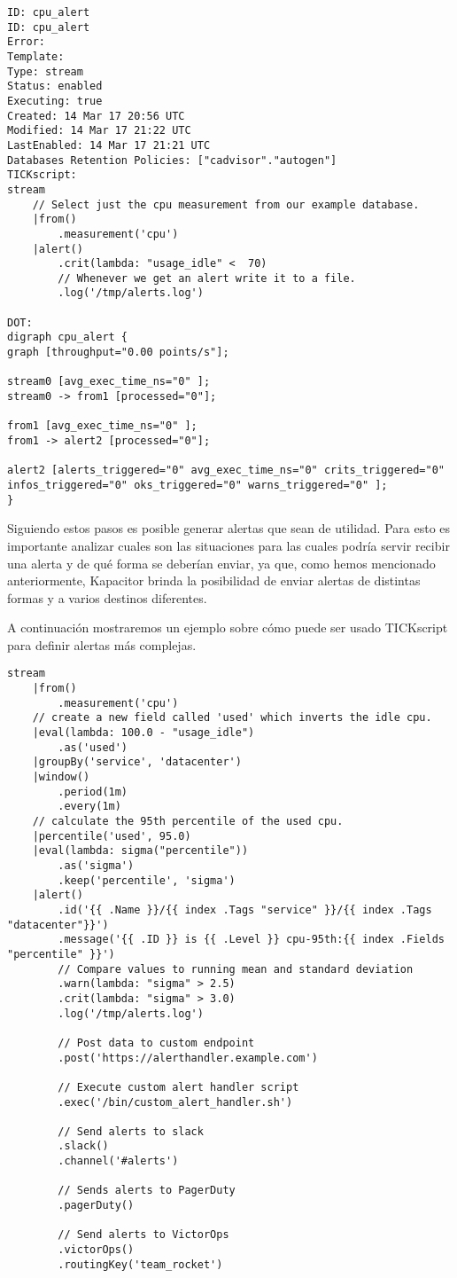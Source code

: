 \begin{lstlisting}
ID: cpu_alert
ID: cpu_alert
Error: 
Template: 
Type: stream
Status: enabled
Executing: true
Created: 14 Mar 17 20:56 UTC
Modified: 14 Mar 17 21:22 UTC
LastEnabled: 14 Mar 17 21:21 UTC
Databases Retention Policies: ["cadvisor"."autogen"]
TICKscript:
stream
    // Select just the cpu measurement from our example database.
    |from()
        .measurement('cpu')
    |alert()
        .crit(lambda: "usage_idle" <  70)
        // Whenever we get an alert write it to a file.
        .log('/tmp/alerts.log')

DOT:
digraph cpu_alert {
graph [throughput="0.00 points/s"];

stream0 [avg_exec_time_ns="0" ];
stream0 -> from1 [processed="0"];

from1 [avg_exec_time_ns="0" ];
from1 -> alert2 [processed="0"];

alert2 [alerts_triggered="0" avg_exec_time_ns="0" crits_triggered="0" infos_triggered="0" oks_triggered="0" warns_triggered="0" ];
}
\end{lstlisting}


Siguiendo estos pasos es posible generar alertas que sean de utilidad. Para esto es importante analizar cuales son las situaciones para las cuales podría servir recibir una alerta y de qué forma se deberían enviar, ya que, como hemos mencionado anteriormente, Kapacitor brinda la posibilidad de enviar alertas de distintas formas y a varios destinos diferentes.

A continuación mostraremos un ejemplo sobre cómo puede ser usado TICKscript para definir alertas más complejas.

\begin{lstlisting}
stream
    |from()
        .measurement('cpu')
    // create a new field called 'used' which inverts the idle cpu.
    |eval(lambda: 100.0 - "usage_idle")
        .as('used')
    |groupBy('service', 'datacenter')
    |window()
        .period(1m)
        .every(1m)
    // calculate the 95th percentile of the used cpu.
    |percentile('used', 95.0)
    |eval(lambda: sigma("percentile"))
        .as('sigma')
        .keep('percentile', 'sigma')
    |alert()
        .id('{{ .Name }}/{{ index .Tags "service" }}/{{ index .Tags "datacenter"}}')
        .message('{{ .ID }} is {{ .Level }} cpu-95th:{{ index .Fields "percentile" }}')
        // Compare values to running mean and standard deviation
        .warn(lambda: "sigma" > 2.5)
        .crit(lambda: "sigma" > 3.0)
        .log('/tmp/alerts.log')

        // Post data to custom endpoint
        .post('https://alerthandler.example.com')

        // Execute custom alert handler script
        .exec('/bin/custom_alert_handler.sh')

        // Send alerts to slack
        .slack()
        .channel('#alerts')

        // Sends alerts to PagerDuty
        .pagerDuty()

        // Send alerts to VictorOps
        .victorOps()
        .routingKey('team_rocket')
\end{lstlisting}


